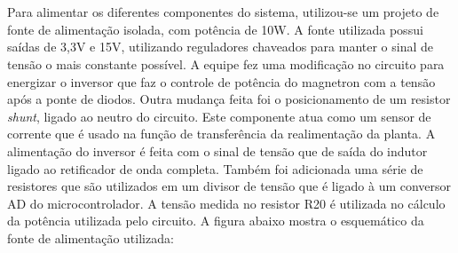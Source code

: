 \section{}
\label{sec:font}

Para alimentar os diferentes componentes do sistema, utilizou-se um projeto de fonte de alimentação isolada, com potência de 10W. A fonte utilizada possui saídas de 3,3V e 15V, utilizando reguladores chaveados para manter o sinal de tensão o mais constante possível. A equipe fez uma modificação no circuito para energizar o inversor que faz o controle de potência do magnetron com a tensão após a ponte de diodos. Outra mudança feita foi o posicionamento de um resistor \textit{shunt}, ligado ao neutro do circuito. Este componente atua como um sensor de corrente que é usado na função de transferência da realimentação da planta. A alimentação do inversor é feita com o sinal de tensão que de saída do indutor ligado ao retificador de onda completa. Também foi adicionada uma série de resistores que são utilizados em um divisor de tensão que é ligado à um conversor AD do microcontrolador. A tensão medida no resistor R20 é utilizada no cálculo da potência utilizada pelo circuito. A figura abaixo mostra o esquemático da fonte de alimentação utilizada:


